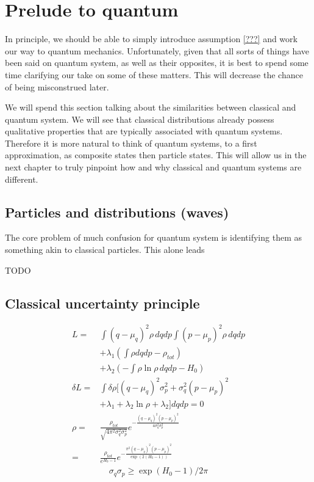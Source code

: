 \documentclass[aps,pra,10pt,twocolumn,floatfix,nofootinbib]{revtex4-1}
\numberwithin{equation}{section}
\theoremstyle{definition}
\begin{document}
\section{Prelude to quantum}

In principle, we should be able to simply introduce assumption \ref{???} and work our way to quantum mechanics. Unfortunately, given that all sorts of things have been said on quantum system, as well as their opposites, it is best to spend some time clarifying our take on some of these matters. This will decrease the chance of being misconstrued later.

We will spend this section talking about the similarities between classical and quantum system. We will see that classical distributions already possess qualitative properties that are typically associated with quantum systems. Therefore it is more natural to think of quantum systems, to a first approximation, as composite states then particle states. This will allow us in the next chapter to truly pinpoint how and why classical and quantum systems are different.

\subsection{Particles and distributions (waves)}

The core problem of much confusion for quantum system is identifying them as something akin to classical particles. This alone leads

TODO

\subsection{Classical uncertainty principle}

\begin{align*}
L = &\int (q-\mu_q)^2 \rho \, dqdp \int (p-\mu_p)^2 \rho \, dqdp \\
&+ \lambda_1(\int \rho dqdp - \rho_{tot})\\
&+ \lambda_2(- \int \rho \ln \rho \, dqdp - H_0)\\
\delta L = &\int \delta \rho [(q-\mu_q)^2 \sigma_p^2 + \sigma_q^2 (p-\mu_p)^2 \\ &+ \lambda_1 + \lambda_2 \ln \rho + \lambda_2 ] dqdp = 0 \\
\rho = &\frac{\rho_{tot}}{ \sqrt{4 \pi ^2\sigma_q^2\sigma_p^2}} e^{-\frac{(q-\mu_q)^2(p-\mu_p)^2}{4\sigma_q^2\sigma_p^2}} \\
= &\frac{\rho_{tot}}{e^{H_0 - 1}} e^{-\frac{\pi ^2(q-\mu_q)^2(p-\mu_p)^2}{\exp (2(H_0 - 1))}}
\end{align*}
\begin{align*}
\sigma_q\sigma_p \geq \exp (H_0 - 1) / 2 \pi 
\end{align*}
\end{document}
